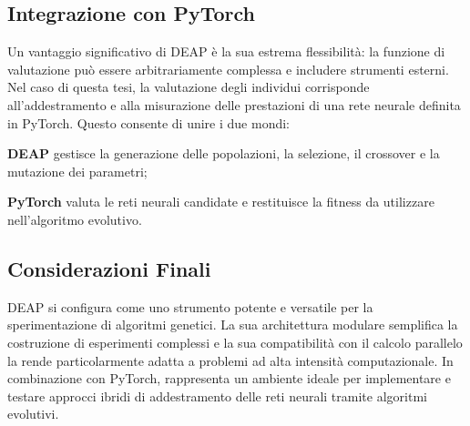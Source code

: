 \subsection{Integrazione con PyTorch}
Un vantaggio significativo di DEAP è la sua estrema flessibilità: la funzione di valutazione può essere arbitrariamente complessa e includere strumenti esterni. Nel caso di questa tesi, la valutazione degli individui corrisponde all'addestramento e alla misurazione delle prestazioni di una rete neurale definita in PyTorch.  
Questo consente di unire i due mondi:
\begin{compactitemize}
    \item \textbf{DEAP} gestisce la generazione delle popolazioni, la selezione, il crossover e la mutazione dei parametri;
    \item \textbf{PyTorch} valuta le reti neurali candidate e restituisce la fitness da utilizzare nell'algoritmo evolutivo.
\end{compactitemize}

\subsection{Considerazioni Finali}
DEAP si configura come uno strumento potente e versatile per la sperimentazione di algoritmi genetici. La sua architettura modulare semplifica la costruzione di esperimenti complessi e la sua compatibilità con il calcolo parallelo la rende particolarmente adatta a problemi ad alta intensità computazionale. In combinazione con PyTorch, rappresenta un ambiente ideale per implementare e testare approcci ibridi di addestramento delle reti neurali tramite algoritmi evolutivi.


